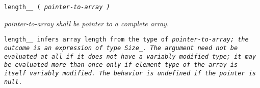 
\tt{length__ (} \it{pointer-to-array} \tt{)}


\it{pointer-to-array} shall be pointer to a complete array.


\tt{length__} infers array length from the type of
\it{pointer-to-array}; the outcome is an expression of type \tt{Size_}.
The argument need not be evaluated at all if it does not have
a variably modified type; it may be evaluated more than once
only if element type of the array is itself variably modified.
The behavior is undefined if the pointer is null.
